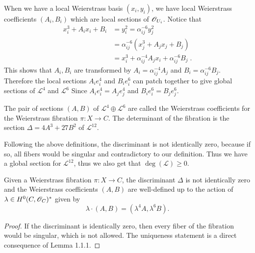 When we have a local Weierstrass basis $(x_i,y_i)$, we have local Weierstrass coefficients $(A_i,B_i)$ which are local sections of $\mathscr{O}_{U_i}$. Notice that
\begin{displaymath}
\begin{split}
x_i^3+A_ix_i+B_i &=y_i^2=\alpha_{ij}^{-6}y_j^2\\
&=\alpha_{ij}^{-6}(x_j^3+A_jx_j+B_j)\\
&=x_i^3+\alpha_{ij}^{-4}A_jx_i+\alpha_{ij}^{-6}B_j\; .
\end{split}
\end{displaymath}
\indent This shows that $A_i,B_i$ are transformed by $A_i=\alpha_{ij}^{-4}A_j$ and $B_i=\alpha_{ij}^{-6}B_j$. Therefore the local sections $A_ie_i^4$ and $B_ie_i^6$ can patch together to give global sections of $\mathcal{L}^4$ and $\mathcal{L}^6$ Since $A_ie_i^4=A_je_j^4$ and $B_ie_i^6=B_je_j^6$.
\begin{definition}
The pair of sections $(A,B)$ of $\mathcal{L}^4\oplus\mathcal{L}^6$ are called the Weierstrass coefficients for the Weierstrass fibration $\pi\colon X\rightarrow C$. The determinant of the fibration is the section $\Delta=4A^3+27B^2$ of $\mathcal{L}^{12}$.
\end{definition}
Following the above definitions, the discriminant is not identically zero, because if so, all fibers would be singular and contradictory to our definition. Thus we have a global section for $\mathscr{L}^{12}$, thus we also get that $\deg(\mathscr{L})\geq 0$.\\ \indent

\begin{lemma}
Given a Weierstrass fibration $\pi\colon X\rightarrow C$, the discriminant $\Delta$ is not identically zero and the Weierstrass coefficients $(A,B)$ are well-defined up to the action of $\lambda\in H^0(C,\mathscr{O}_C)^*$ given by \[ \lambda\cdot(A,B)=(\lambda^4A,\lambda^6B). \]
\end{lemma}
\begin{proof}
If the discriminant is identically zero, then every fiber of the fibration would be singular, which is not allowed. The uniqueness statement is a direct consequence of Lemma 1.1.1.
\end{proof}

